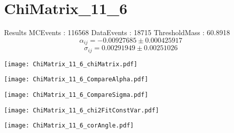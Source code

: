 \documentclass[a4paper,12pt]{article}
\begin{document}
\section{ChiMatrix\_11\_6}
\begin{minipage}{0.49\linewidth} Results \newline
MCEvents : 116568\newline
DataEvents : 18715 \newline
ThresholdMass : 60.8918\\
$$\alpha_{ij} = -0.00927685\pm 0.000425917$$
$$\sigma_{ij} = 0.00291949\pm 0.00251026$$
\end{minipage}\hfill
\begin{minipage}{0.49\linewidth} 
\texttt{[image: ChiMatrix\_11\_6\_chiMatrix.pdf]}\\
\end{minipage}
\hfill
\begin{minipage}{0.49\linewidth} 
\texttt{[image: ChiMatrix\_11\_6\_CompareAlpha.pdf]}\\
\end{minipage}
\hfill
\begin{minipage}{0.49\linewidth} 
\texttt{[image: ChiMatrix\_11\_6\_CompareSigma.pdf]}\\
\end{minipage}
\begin{minipage}{0.49\linewidth} 
\texttt{[image: ChiMatrix\_11\_6\_chi2FitConstVar.pdf]}\\
\end{minipage}
\hfill
\begin{minipage}{0.49\linewidth} 
\texttt{[image: ChiMatrix\_11\_6\_corAngle.pdf]}\\
\end{minipage}
\end{document}
